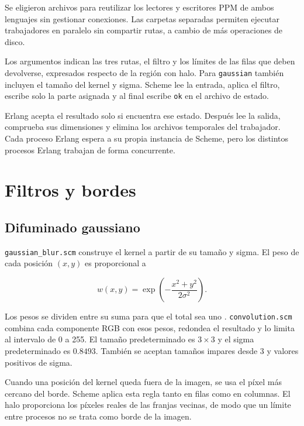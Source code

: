 \documentclass[11pt]{article}
\begin{document}
Se eligieron archivos para reutilizar los lectores y escritores PPM de ambos
lenguajes sin gestionar conexiones. Las carpetas separadas permiten ejecutar
trabajadores en paralelo sin compartir rutas, a cambio de más operaciones
de disco.

Los argumentos indican las tres rutas, el filtro y los límites de las filas
que deben devolverse, expresados respecto de la región con halo. Para
\texttt{gaussian} también incluyen el tamaño del kernel y sigma. Scheme lee
la entrada, aplica el filtro, escribe solo la parte asignada y al final escribe
\texttt{ok} en el archivo de estado.

Erlang acepta el resultado solo si encuentra ese estado. Después lee la
salida, comprueba sus dimensiones y elimina los archivos temporales del
trabajador. Cada proceso Erlang espera a su propia instancia de Scheme, pero
los distintos procesos Erlang trabajan de forma concurrente.

\newpage

\section{Filtros y bordes}

\subsection{Difuminado gaussiano}

\texttt{gaussian\_blur.scm} construye el kernel a partir de su tamaño y sigma.
El peso de cada posición $(x,y)$ es proporcional a

\begin{equation}
    w(x,y)=\exp\left(-\frac{x^2+y^2}{2\sigma^2}\right).
\end{equation}

Los pesos se dividen entre su suma para que el total sea uno
\cite{mit-gaussian}.
\texttt{convolution.scm} combina cada componente RGB con esos pesos, redondea
el resultado y lo limita al intervalo de 0 a 255. El tamaño predeterminado
es $3\times3$ y el sigma predeterminado es $0.8493$. También se aceptan
tamaños impares desde 3 y valores positivos de sigma.

Cuando una posición del kernel queda fuera de la imagen, se usa el píxel
más cercano del borde. Scheme aplica esta regla tanto en filas como en
columnas. El halo proporciona los píxeles reales de las franjas vecinas, de
modo que un límite entre procesos no se trata como borde de la imagen.
\end{document}
